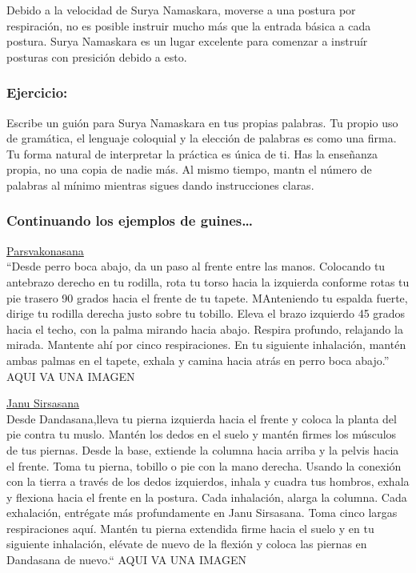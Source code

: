 Debido a la velocidad de Surya Namaskara, moverse a una postura por respiración, no es posible instruir mucho más que la entrada básica a cada postura. Surya Namaskara es un lugar excelente para comenzar a instruír posturas con presición debido a esto.

\subsubsection{Ejercicio:}
Escribe un guión para Surya Namaskara en tus propias palabras. Tu propio uso de gramática, el lenguaje coloquial y la elección de palabras es como una firma. Tu forma natural de interpretar la práctica es única de ti. Has la enseñanza propia, no una copia de nadie más. Al mismo tiempo, mantn el número de palabras al mínimo mientras sigues dando instrucciones claras.

\subsubsection{Continuando los ejemplos de guines\ldots}
\underline{Parsvakonasana}\\
``Desde perro boca abajo, da un paso al frente entre las manos. Colocando tu antebrazo derecho en tu rodilla, rota tu torso hacia la izquierda conforme rotas tu pie trasero 90 grados hacia el frente de tu tapete. MAnteniendo tu espalda fuerte, dirige tu rodilla derecha justo sobre tu tobillo. Eleva el brazo izquierdo 45 grados hacia el techo, con la palma mirando hacia abajo. Respira profundo, relajando la mirada. Mantente ahí por cinco respiraciones. En tu siguiente inhalación, mant\'en ambas palmas en el tapete, exhala y camina hacia atrás en perro boca abajo.''
AQUI VA UNA IMAGEN

\underline{Janu Sirsasana}\\
Desde Dandasana,lleva tu pierna izquierda hacia el frente y coloca la planta del pie contra tu muslo. Mant\'en los dedos en el suelo y mant\'en firmes los músculos de tus piernas. Desde la base, extiende la columna hacia arriba y la pelvis hacia el frente. Toma tu pierna, tobillo o pie con la mano derecha. Usando la conexión con la tierra a trav\'es de los dedos izquierdos, inhala y cuadra tus hombros, exhala y flexiona hacia el frente en la postura. Cada inhalación, alarga la columna. Cada exhalación, entr\'egate más profundamente en Janu Sirsasana. Toma cinco largas respiraciones aquí. Mant\'en tu pierna extendida firme hacia el suelo y en tu siguiente inhalación, el\'evate de nuevo de la flexión y coloca las piernas en Dandasana de nuevo.``
AQUI VA UNA IMAGEN

